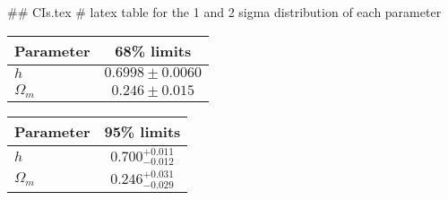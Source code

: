 ## CIs.tex
# latex table for the 1 and 2 sigma distribution of each parameter

\begin{tabular} { l  c}
 Parameter &  68\% limits\\
\hline
{\boldmath$h              $} & $0.6998\pm 0.0060          $\\
{\boldmath$\Omega_m       $} & $0.246\pm 0.015            $\\
\hline
\end{tabular}

\begin{tabular} { l  c}
 Parameter &  95\% limits\\
\hline
{\boldmath$h              $} & $0.700^{+0.011}_{-0.012}   $\\
{\boldmath$\Omega_m       $} & $0.246^{+0.031}_{-0.029}   $\\
\hline
\end{tabular}
